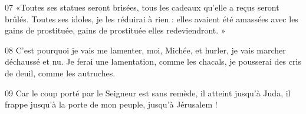 
07 «Toutes ses statues seront brisées, tous les cadeaux qu’elle a reçus seront brûlés. Toutes ses idoles, je les réduirai à rien : elles avaient été amassées avec les gains de prostituée, gains de prostituée elles redeviendront. »

08 C’est pourquoi je vais me lamenter, moi, Michée, et hurler, je vais marcher déchaussé et nu. Je ferai une lamentation, comme les chacals, je pousserai des cris de deuil, comme les autruches.

09 Car le coup porté par le Seigneur est sans remède, il atteint jusqu’à Juda, il frappe jusqu’à la porte de mon peuple, jusqu’à Jérusalem !